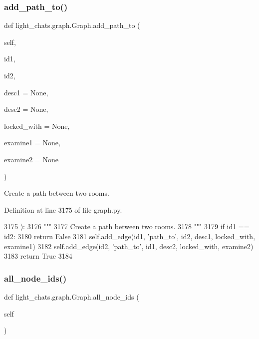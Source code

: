 \subsubsection{\texorpdfstring{add\+\_\+path\+\_\+to()}{add\_path\_to()}}
{\footnotesize\ttfamily def light\+\_\+chats.\+graph.\+Graph.\+add\+\_\+path\+\_\+to (\begin{DoxyParamCaption}\item[{}]{self,  }\item[{}]{id1,  }\item[{}]{id2,  }\item[{}]{desc1 = {\ttfamily None},  }\item[{}]{desc2 = {\ttfamily None},  }\item[{}]{locked\+\_\+with = {\ttfamily None},  }\item[{}]{examine1 = {\ttfamily None},  }\item[{}]{examine2 = {\ttfamily None} }\end{DoxyParamCaption})}

\begin{DoxyVerb}Create a path between two rooms.
\end{DoxyVerb}
 

Definition at line 3175 of file graph.\+py.


\begin{DoxyCode}
3175     ):
3176         \textcolor{stringliteral}{"""}
3177 \textcolor{stringliteral}{        Create a path between two rooms.}
3178 \textcolor{stringliteral}{        """}
3179         \textcolor{keywordflow}{if} id1 == id2:
3180             \textcolor{keywordflow}{return} \textcolor{keyword}{False}
3181         self.add\_edge(id1, \textcolor{stringliteral}{'path\_to'}, id2, desc1, locked\_with, examine1)
3182         self.add\_edge(id2, \textcolor{stringliteral}{'path\_to'}, id1, desc2, locked\_with, examine2)
3183         \textcolor{keywordflow}{return} \textcolor{keyword}{True}
3184 
\end{DoxyCode}
\mbox{\label{classlight__chats_1_1graph_1_1Graph_a1200144ee93bfb6e3abae4a41ba10cf0}} 
\subsubsection{\texorpdfstring{all\+\_\+node\+\_\+ids()}{all\_node\_ids()}}
{\footnotesize\ttfamily def light\+\_\+chats.\+graph.\+Graph.\+all\+\_\+node\+\_\+ids (\begin{DoxyParamCaption}\item[{}]{self }\end{DoxyParamCaption})}

